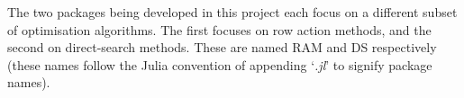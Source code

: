 %
%
%
%

The two packages being developed in this project each focus on a different subset of optimisation algorithms. The first focuses on row action methods, and the second on direct-search methods. These are named \ac{RAM} and \ac{DS} respectively (these names follow the Julia convention of appending `\textit{.jl}' to signify package names).

